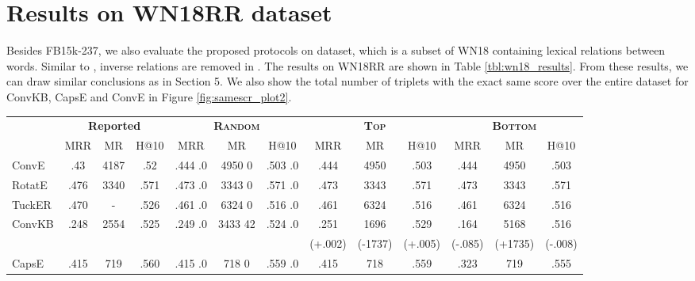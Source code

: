 \documentclass[11pt,a4paper]{article}
\begin{document}
\section{Results on WN18RR dataset}
Besides FB15k-237, we also evaluate the proposed protocols on \datawn{} \cite{conve} dataset, which is a subset of WN18 \cite{transe} containing lexical relations between words. Similar to \datafb{}, inverse relations are removed in \datawn{}. The results on WN18RR are shown in Table \ref{tbl:wn18_results}. From these results, we can draw similar conclusions as in Section 5. We also show the total number of triplets with the exact same score over the entire \datawn{} dataset for ConvKB, CapsE and ConvE in Figure \ref{fig:samescr_plot2}.

\setlength{\tabcolsep}{1.5pt}

\begin{table*}[!htb]
\small
	\centering
	\begin{tabular}{lccc|ccc|ccc|ccc}
		\toprule
		&  \multicolumn{3}{c}{\textbf{Reported}} & \multicolumn{3}{c}{\textbf{\textsc{Random}}} & \multicolumn{3}{c}{\textbf{\textsc{Top}}} & \multicolumn{3}{c}{\textbf{\textsc{Bottom}}} \\ 
		\cmidrule(r){2-4}  \cmidrule(r){5-7} \cmidrule(r){8-10} \cmidrule(r){11-13}
		& MRR  & MR  & H@10  & MRR   & MR  & H@10  & MRR  & MR  & H@10  & MRR  & MR  & H@10  \\
		\midrule
ConvE 		& .43  & 4187 & .52  	& .444  .0	& 4950  0	& .503  .0 	& .444	& 4950	& .503 	& .444	& 4950	& .503 \\
		RotatE 		& .476 &	3340 & .571 & .473  .0	& 3343  0 & .571  .0 & .473 & 3343 & .571 & .473 & 3343 & .571 \\ 
		TuckER 		& .470 & -    & .526 	& .461  .0	 & 6324  0	& .516  .0	& .461	 & 6324	& .516	& .461	 & 6324	& .516 \\
		\midrule
		\midrule
		\multirow{2}{*}{ConvKB} 		& \multirow{2}{*}{.248} & \multirow{2}{*}{2554} & \multirow{2}{*}{.525} 	& \multirow{2}{*}{.249  .0}	& \multirow{2}{*}{3433  42}	&\multirow{2}{*}{.524  .0} & .251&	1696&	.529 & .164&	5168&	.516 \\
		& & & & & & & (+.002) & (-1737)& (+.005) & (-.085) & (+1735) & (-.008)\\
		\midrule
		\multirow{2}{*}{CapsE\ddag} 		& \multirow{2}{*}{.415} &  \multirow{2}{*}{719} & \multirow{2}{*}{.560} &
		\multirow{2}{*}{.415  .0}& \multirow{2}{*}{718  0}	&\multirow{2}{*}{.559  .0} & \multirow{2}{*}{.415} &	\multirow{2}{*}{718}	& \multirow{2}{*}{.559} & .323	& 719 & .555 \\ 

\end{tabular}
\end{table*}
\end{document}

